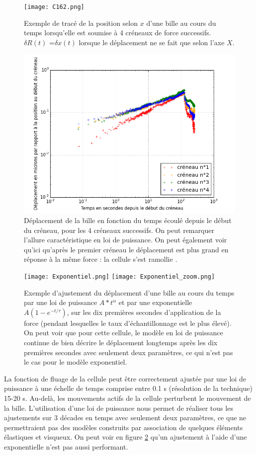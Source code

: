 \begin{figure}
\texttt{[image: C162.png]}

\caption{Exemple de tracé de la position selon $x$ d'une bille au cours du temps lorsqu'elle est soumise à 4 créneaux de force successifs. $\delta R(t)$ =$\delta x(t)$ lorsque le déplacement ne se fait que selon l'axe $X$.\label{Exemple}} 
	\includegraphics[scale=0.40]{Figures/Exemple_C162_loglog.png}
	\caption{Déplacement de la bille en fonction du temps écoulé depuis le début du créneau, pour les 4 créneaux successifs. On peut remarquer l'allure caractéristique en loi de puissance. On peut également voir qu'ici qu'après le premier créneau le déplacement est plus grand en réponse à la même force : la cellule s'est \og ramollie \fg. }
\end{figure}

\begin{figure}
\texttt{[image: Exponentiel.png]}
\texttt{[image: Exponentiel\_zoom.png]}
\caption{\label{Fits comparés} Exemple d'ajustement du déplacement d'une bille au cours du temps par une loi de puissance $A*t^{\alpha}$ et par une exponentielle $A(1-e^{-t/\tau})$, sur les dix premières secondes d'application de la force (pendant lesquelles le taux d'échantillonnage est le plus élevé). On peut voir que pour cette cellule, le modèle en loi de puissance continue de bien décrire le déplacement longtemps après les dix premières secondes avec seulement deux paramètres, ce qui n'est pas le cas pour le modèle exponentiel. }
\end{figure}

La fonction de fluage de la cellule peut être correctement ajustée par une loi de puissance à une échelle de temps comprise entre 0.1 s (résolution de la technique) 15-20 s. Au-delà, les mouvements actifs de la cellule perturbent le mouvement de la bille.  
L'utilisation d'une loi de puissance nous permet de réaliser tous les ajustements sur 3 décades en temps avec seulement deux paramètres, ce que ne permettraient pas des modèles construits par association de quelques éléments élastiques et visqueux. On peut voir en figure \ref{Fits comparés} qu'un ajustement à l'aide d'une exponentielle n'est pas aussi performant. 

